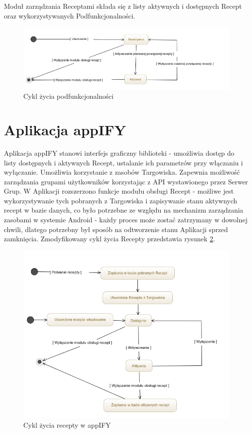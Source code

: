 \documentclass[11pt,a4paper,polish,thesis]{dcsbook}
\begin{document}
Moduł zarządzania Receptami składa się z listy aktywnych i dostępnych Recept oraz wykorzystywanych Podfunkcjonalności.
\begin{figure}[H]
  \centering
  \includegraphics[scale=0.6]{./resources/cykl-zycia-featurea.jpg}
  \caption{Cykl życia podfunkcjonalności}
  \label{fig:cykl-zycia-featurea}
\end{figure}

\section{Aplikacja appIFY}
Aplikacja appIFY stanowi interfejs graficzny biblioteki - umożliwia dostęp do listy dostępnych i aktywnych Recept, ustalanie ich parametrów przy włączaniu i wyłączanie. Umożliwia korzystanie z zasobów Targowiska. Zapewnia możliwość zarządzania grupami użytkowników korzystając z API wystawionego przez Serwer Grup.
W Aplikacji rozszerzono funkcje modułu obsługi Recept - możliwe jest wykorzystywanie tych pobranych z Targowiska i zapisywanie stanu aktywnych recept w bazie danych, co było potrzebne ze względu na mechanizm zarządzania zasobami w systemie Android - każdy proces może zostać zatrzymany w dowolnej chwili, dlatego potrzebny był sposób na odtworzenie stanu Aplikacji sprzed zamknięcia. Zmodyfikowany cykl życia Recepty przedstawia rysunek \ref{fig:cykl-zycia-recepty-appify}.
\begin{figure}[H]
  \centering
  \includegraphics[scale=0.7]{./resources/cykl-zycia-recepty-appify.jpg}
  \caption{Cykl życia recepty w appIFY}
  \label{fig:cykl-zycia-recepty-appify}
\end{figure}
\end{document}
